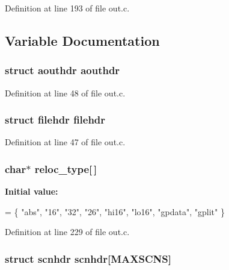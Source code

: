 Definition at line 193 of file out.\+c.



\subsection{Variable Documentation}
\subsubsection[{aouthdr}]{\setlength{\rightskip}{0pt plus 5cm}struct {\bf aouthdr} {\bf aouthdr}}\label{out_8c_a2a0b0cf7e410b15145ca78d844d23587}


Definition at line 48 of file out.\+c.

\subsubsection[{filehdr}]{\setlength{\rightskip}{0pt plus 5cm}struct {\bf filehdr} {\bf filehdr}}\label{out_8c_ae2cad495c9185256f6ee5155593c3dc4}


Definition at line 47 of file out.\+c.

\subsubsection[{reloc\+\_\+type}]{\setlength{\rightskip}{0pt plus 5cm}char$\ast$ reloc\+\_\+type[$\,$]}\label{out_8c_a5ef7cba993bb6e3daa67c9121cd60d21}
{\bfseries Initial value\+:}
\begin{DoxyCode}
= \{
  \textcolor{stringliteral}{"abs"}, \textcolor{stringliteral}{"16"}, \textcolor{stringliteral}{"32"}, \textcolor{stringliteral}{"26"}, \textcolor{stringliteral}{"hi16"}, \textcolor{stringliteral}{"lo16"}, \textcolor{stringliteral}{"gpdata"}, \textcolor{stringliteral}{"gplit"}
\}
\end{DoxyCode}


Definition at line 229 of file out.\+c.

\subsubsection[{scnhdr}]{\setlength{\rightskip}{0pt plus 5cm}struct {\bf scnhdr} {\bf scnhdr}[{\bf M\+A\+X\+S\+C\+NS}]}\label{out_8c_a1d2d0976dbb2fb5fc8af48e030416b2d}



